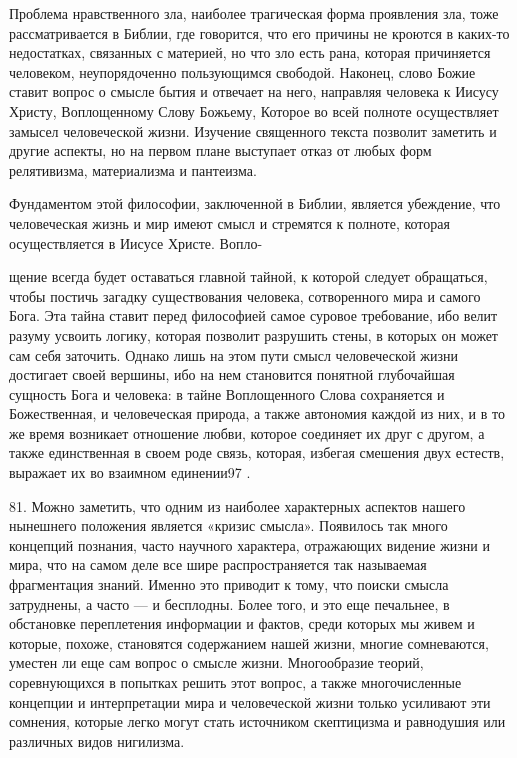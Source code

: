 \documentclass[a5paper,10pt]{article}
\begin{document}
Проблема нравственного зла, наиболее трагическая форма проявления зла, тоже
рассматривается в Библии, где говорится, что его причины не кроются в каких-то
недостатках, связанных с материей, но что зло есть рана, которая причиняется
человеком, неупорядоченно пользующимся свободой. Наконец, слово Божие ставит
вопрос о смысле бытия и отвечает на него, направляя человека к Иисусу Христу,
Воплощенному Слову Божьему, Которое во всей полноте осуществляет замысел
человеческой жизни. Изучение священного текста позволит заметить и другие
аспекты, но на первом плане выступает отказ от любых форм релятивизма,
материализма и пантеизма.

Фундаментом этой философии, заключенной в Библии, является убеждение, что
человеческая жизнь и мир имеют смысл и стремятся к полноте, которая
осуществляется в Иисусе Христе. Вопло-

щение всегда будет оставаться главной тайной, к которой следует обращаться,
чтобы постичь загадку существования человека, сотворенного мира и самого Бога.
Эта тайна ставит перед философией самое суровое требование, ибо велит разуму
усвоить логику, которая позволит разрушить стены, в которых он может сам себя
заточить. Однако лишь на этом пути смысл человеческой жизни достигает своей
вершины, ибо на нем становится понятной глубочайшая сущность Бога и человека: в
тайне Воплощенного Слова сохраняется и Божественная, и человеческая природа, а
также автономия каждой из них, и в то же время возникает отношение любви,
которое соединяет их друг с другом, а также единственная в своем роде связь,
которая, избегая смешения двух естеств, выражает их во взаимном единении97 .

81. Можно заметить, что одним из наиболее характерных аспектов нашего нынешнего
положения является «кризис смысла». Появилось так много концепций познания,
часто научного характера, отражающих видение жизни и мира, что на самом деле
все шире распространяется так называемая фрагментация знаний. Именно это
приводит к тому, что поиски смысла затруднены, а часто — и бесплодны. Более
того, и это еще печальнее, в обстановке переплетения информации и фактов, среди
которых мы живем и которые, похоже, становятся содержанием нашей жизни, многие
сомневаются, уместен ли еще сам вопрос о смысле жизни. Многообразие теорий,
соревнующихся в попытках решить этот вопрос, а также многочисленные концепции и
интерпретации мира и человеческой жизни только усиливают эти сомнения, которые
легко могут стать источником скептицизма и равнодушия или различных видов
нигилизма.
\end{document}
